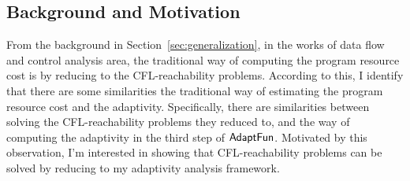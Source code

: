 \subsection*{Background and Motivation}
\label{sec:cfl-backgroung}
From the background in Section~\ref{sec:generalization},
in the works of data flow and control analysis area,
the traditional way of computing the program resource cost is
by reducing to the CFL-reachability problems.
%
According to this, 
I identify 
that there are some similarities the traditional way of estimating the program resource cost and 
the adaptivity.
Specifically, there are similarities between solving the CFL-reachability problems they reduced to,
 and the way of computing the adaptivity in 
the third step of $\textsf{AdaptFun}$.
 Motivated by this observation, 
 I'm interested in showing that
 CFL-reachability problems can be solved by reducing to my adaptivity analysis framework.
